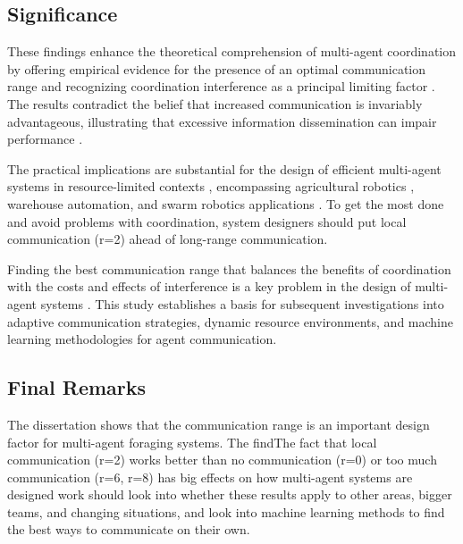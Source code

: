 \subsection{Significance}

These findings enhance the theoretical comprehension of multi-agent coordination \citep{stone2000multiagent, panait2005cooperative} by offering empirical evidence for the presence of an optimal communication range and recognizing coordination interference as a principal limiting factor \citep{lynch1996distributed}. The results contradict the belief that increased communication is invariably advantageous, illustrating that excessive information dissemination can impair performance \citep{zhang2024}.

The practical implications are substantial for the design of efficient multi-agent systems in resource-limited contexts \citep{farinelli2004multirobot}, encompassing agricultural robotics \citep{bechar2016agricultural, fountas2020agricultural}, warehouse automation, and swarm robotics applications \citep{brambilla2013swarm}. To get the most done and avoid problems with coordination, system designers should put local communication (r=2) ahead of long-range communication.

Finding the best communication range that balances the benefits of coordination with the costs and effects of interference is a key problem in the design of multi-agent systems \citep{shoham2008multiagent}. This study establishes a basis for subsequent investigations into adaptive communication strategies, dynamic resource environments, and machine learning methodologies for agent communication.

\subsection{Final Remarks}The dissertation shows that the communication range is an important design factor for multi-agent foraging systems. The findThe fact that local communication (r=2) works better than no communication (r=0) or too much communication (r=6, r=8) has big effects on how multi-agent systems are designed work should look into whether these results apply to other areas, bigger teams, and changing situations, and look into machine learning methods to find the best ways to communicate on their own.


